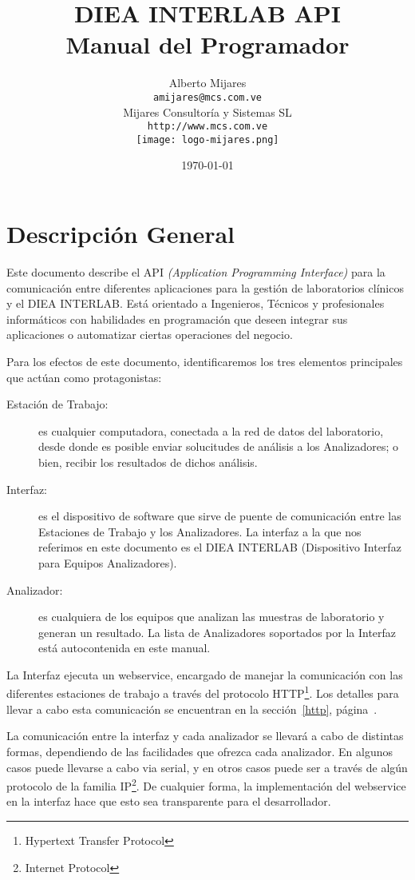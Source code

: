 \documentclass[titlepage,12pt]{article}
\title{DIEA INTERLAB API\\
Manual del Programador}
\author{Alberto Mijares\\  
\texttt{amijares@mcs.com.ve}\\
Mijares Consultoría y Sistemas SL\\
\texttt{http://www.mcs.com.ve}\\
\texttt{[image: logo-mijares.png]}}
\date{\today}
\begin{document}
\maketitle

\tableofcontents

\newpage

\parskip=5mm

\section{Descripción General}\label{general}

Este documento describe el API \emph{(Application Programming
  Interface)} para la comunicación entre diferentes aplicaciones para
la gestión de laboratorios clínicos y el DIEA INTERLAB. Está orientado
a Ingenieros, Técnicos y profesionales informáticos con habilidades en
programación que deseen integrar sus aplicaciones o automatizar
ciertas operaciones del negocio.

Para los efectos de este documento, identificaremos los tres elementos
principales que actúan como protagonistas:
\begin{description}
  \item[Estación de Trabajo:] es cualquier computadora,
    conectada a la red de datos del laboratorio, desde donde es
    posible enviar solucitudes de análisis a los Analizadores; o bien,
    recibir los resultados de dichos análisis.
  \item[Interfaz:] es el dispositivo de software que sirve de
    puente de comunicación entre las Estaciones de Trabajo y los
    Analizadores. La interfaz a la que nos referimos en este documento
    es el DIEA INTERLAB (Dispositivo Interfaz para Equipos Analizadores).
  \item[Analizador:] es cualquiera de los equipos que analizan
    las muestras de laboratorio y generan un resultado. La lista de
    Analizadores soportados por la Interfaz está autocontenida en este
    manual.
\end{description}

La Interfaz ejecuta un webservice, encargado de manejar la
comunicación con las diferentes estaciones de trabajo a través del
protocolo HTTP\footnote{Hypertext Transfer Protocol}. Los detalles
para llevar a cabo esta comunicación se encuentran en la
sección~\ref{http}, página~\pageref{http}.

La comunicación entre la interfaz y cada analizador se llevará a cabo
de distintas formas, dependiendo de las facilidades que ofrezca cada
analizador. En algunos casos puede llevarse a cabo via serial, y en
otros casos puede ser a través de algún protocolo de la familia
IP\footnote{Internet Protocol}. De cualquier forma, la implementación
del webservice en la interfaz hace que esto sea transparente para el
desarrollador.
\end{document}
